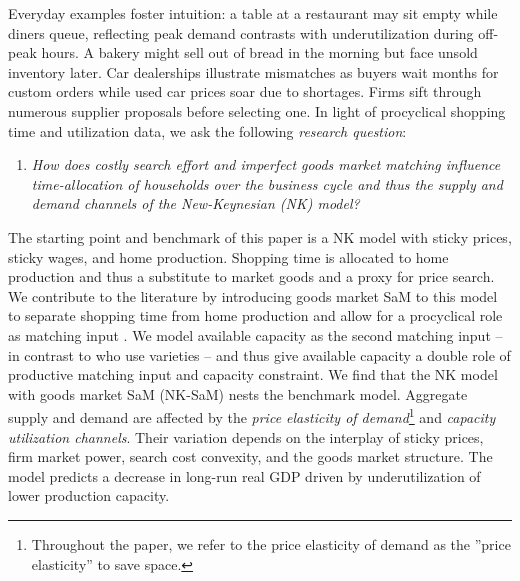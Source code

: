 \documentclass[12pt,3p,authoryear,review]{elsarticle}
\begin{document}
Everyday examples foster intuition: a table at a restaurant may sit empty while diners queue, reflecting peak demand contrasts with underutilization during off-peak hours. A bakery might sell out of bread in the morning but face unsold inventory later. Car dealerships illustrate mismatches as buyers wait months for custom orders while used car prices soar due to shortages. Firms sift through numerous supplier proposals before selecting one. In light of procyclical shopping time and utilization data, we ask the following \emph{research question}:%
\begin{enumerate}%
	\item[] \emph{How does costly search effort and imperfect goods market matching influence time-allocation of households over the business cycle and thus the supply and demand channels of the New-Keynesian (NK) model?}%
\end{enumerate}%
The starting point and benchmark of this paper is a NK model with sticky prices, sticky wages, and home production. Shopping time is allocated to home production and thus a substitute to market goods and a proxy for price search. We contribute to the literature by introducing goods market SaM to this model to separate shopping time from home production and allow for a procyclical role as matching input \citep{petrosky-nadeauShoppingTime2016}. We model available capacity as the second matching input \citep{michaillatAggregateDemandIdle2015,sun2024excess} -- in contrast to \cite{qiuProcyclicalProductivityNew2022} who use varieties -- and thus give available capacity a double role of productive matching input and capacity constraint. We find that the NK model with goods market SaM (NK-SaM) nests the benchmark model. Aggregate supply and demand are affected by the \emph{price elasticity of demand}\footnote{Throughout the paper, we refer to the price elasticity of demand as the ''price elasticity'' to save space.} and \emph{capacity utilization channels}. Their variation depends on the interplay of sticky prices, firm market power, search cost convexity, and the goods market structure. The model predicts a decrease in long-run real GDP driven by underutilization of lower production capacity.\\%
\end{document}
